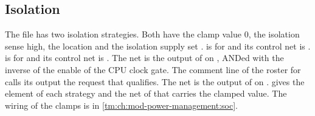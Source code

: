 \subsection{Isolation}
The file has two isolation strategies. Both have the clamp value 0, the isolation sense high, the location  and the isolation supply set .  is for  and its control net is .  is for  and its control net is . The net  is the output  of  on , ANDed with the inverse of the enable of the CPU clock gate. The comment line of the roster for  calls its output the request that  qualifies. The net  is the output  of  on .  gives the element of each strategy and the net of  that carries the clamped value. The wiring of the clamps is in \cref{tm:ch:mod-power-management:soc}.

